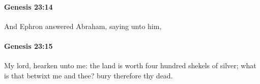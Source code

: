 		\paragraph{Genesis 23:14} %
			\label{GENESIS-23-14}

			And Ephron answered Abraham, saying unto him,


		\paragraph{Genesis 23:15} %
			\label{GENESIS-23-15}

			My lord, hearken unto me: the land is worth four hundred shekels of silver; what is that betwixt me and thee? bury therefore thy dead.


